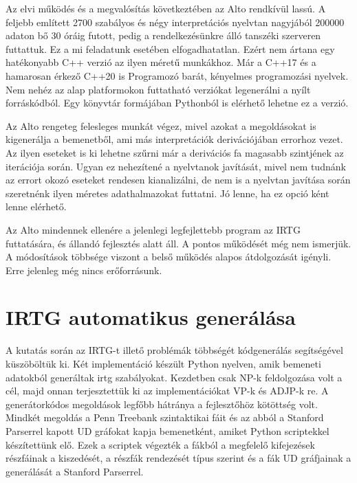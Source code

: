Az elvi működés és a megvalósítás következtében az Alto rendkívül lassú. 
A feljebb említett 2700 szabályos és négy interpretációs nyelvtan nagyjából 200000 adaton bő 30 óráig futott, pedig a rendelkezésünkre álló tanszéki szerveren futtattuk. 
Ez a mi feladatunk esetében elfogadhatatlan. 
Ezért nem ártana egy hatékonyabb C++ verzió az ilyen méretű munkákhoz. 
Már a C++17 és a hamarosan érkező C++20 is Programozó barát, kényelmes programozási nyelvek.
Nem nehéz az alap platformokon futtatható verziókat legenerálni a nyílt forráskódból. 
Egy könyvtár formájában Pythonból is elérhető lehetne ez a verzió.

Az Alto rengeteg felesleges munkát végez, mivel azokat a megoldásokat is kigenerálja a bemenetből, ami más interpretációk derivációjában errorhoz vezet. 
Az ilyen eseteket is ki lehetne szűrni már a derivációs fa magasabb szintjének az iterációja során. 
Ugyan ez nehezítené a nyelvtanok javítását, mivel nem tudnánk az errort okozó eseteket rendesen kianalizálni, de nem is a nyelvtan javítása során szeretnénk ilyen méretes adathalmazokat futtatni. 
Jó lenne, ha ez opció ként lenne elérhető. 

Az Alto mindennek ellenére a jelenlegi legfejlettebb program az IRTG futtatására, és állandó fejlesztés alatt áll. 
A pontos működését még nem ismerjük. 
A módosítások többsége viszont a belső működés alapos átdolgozását igényli. 
Erre jelenleg még nincs erőforrásunk.

\section{IRTG automatikus generálása}
\label{sec:solutions}
A kutatás során az IRTG-t illető problémák többségét kódgenerálás segítségével küszöböltük ki. 
Két implementáció készült Python nyelven, amik bemeneti adatokból generáltak irtg szabályokat. 
Kezdetben csak NP-k feldolgozása volt a cél, majd onnan terjesztettük ki az implementációkat VP-k és ADJP-k re. 
A generátorkódos megoldások legfőbb hátránya a fejlesztőhöz kötöttség volt. 
Mindkét megoldás a Penn Treebank szintaktikai fáit és az abból a Stanford Parserrel kapott UD gráfokat kapja bemenetként, amiket Python scriptekkel készítettünk elő. 
Ezek a scriptek végezték a fákból a megfelelő kifejezések részfáinak a kiszedését, a részfák rendezését típus szerint és a fák UD gráfjainak a generálását a Stanford Parserrel.

